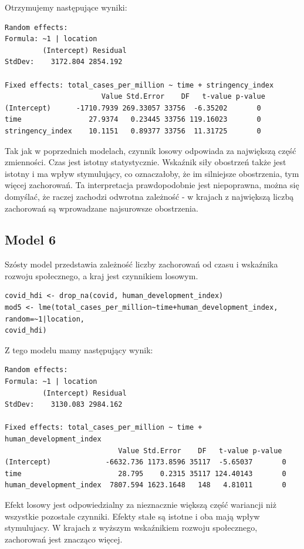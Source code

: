 \documentclass[12pt]{mwbk}
\theoremstyle{plain}
\theoremstyle{definition}
\theoremstyle{remark}
\begin{document}
Otrzymujemy następujące wyniki:
\begin{verbatim}
Random effects:
Formula: ~1 | location
         (Intercept) Residual
StdDev:    3172.804 2854.192

Fixed effects: total_cases_per_million ~ time + stringency_index 
                       Value Std.Error    DF   t-value p-value
(Intercept)      -1710.7939 269.33057 33756  -6.35202       0
time                27.9374   0.23445 33756 119.16023       0
stringency_index    10.1151   0.89377 33756  11.31725       0
\end{verbatim}

Tak jak w poprzednich modelach, czynnik losowy odpowiada za największą część zmienności. Czas jest istotny statystycznie. Wskaźnik siły obostrzeń także jest istotny i ma wpływ stymulujący, co oznaczałoby, że im silniejsze obostrzenia, tym więcej zachorowań. Ta interpretacja prawdopodobnie jest niepoprawna, można się domyślać, że raczej zachodzi odwrotna zależność - w krajach z największą liczbą zachorowań są wprowadzane najsurowsze obostrzenia.

\subsection{Model 6}

Szósty model przedstawia zależność liczby zachorowań od czasu i wskaźnika rozwoju społecznego, a kraj jest czynnikiem losowym.

\begin{verbatim}
covid_hdi <- drop_na(covid, human_development_index)
mod5 <- lme(total_cases_per_million~time+human_development_index,
random=~1|location,
covid_hdi)
\end{verbatim}

Z tego modelu mamy następujący wynik:

\begin{verbatim}
Random effects:
Formula: ~1 | location
         (Intercept) Residual
StdDev:    3130.083 2984.162

Fixed effects: total_cases_per_million ~ time + human_development_index 
                           Value Std.Error    DF   t-value p-value
(Intercept)             -6632.736 1173.8596 35117  -5.65037       0
time                       28.795    0.2315 35117 124.40143       0
human_development_index  7807.594 1623.1648   148   4.81011       0
\end{verbatim}

Efekt losowy jest odpowiedzialny za nieznacznie większą część wariancji niż wszystkie pozostałe czynniki. Efekty stałe są istotne i oba mają wpływ stymulujacy. W krajach z wyższym wskaźnikiem rozwoju społecznego, zachorowań jest znacząco więcej.
\end{document}
